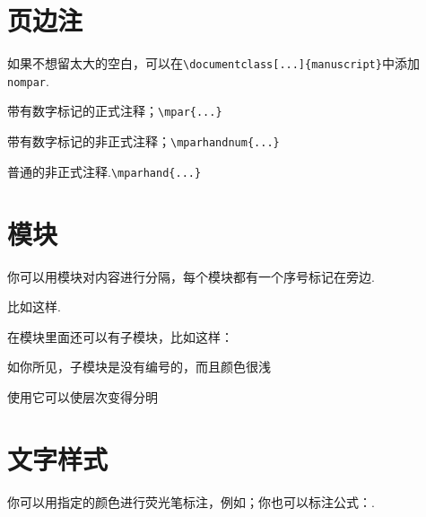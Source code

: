 \documentclass[9pt,oneside,mpar,cn,nclassical]{manuscript}
\begin{document}
    \vspace{-\baselineskip}
    \section{页边注}\subtitle{书写想法的绝妙空白}
    
        如果不想留太大的空白，可以在\verb|\documentclass[...]{manuscript}|中添加\verb|nompar|.
        \begin{itemize*}
            \item 带有数字标记的正式注释；\hfill\verb|\mpar{...}|
            \item 带有数字标记的非正式注释；\hfill\verb|\mparhandnum{...}|
            \item 普通的非正式注释.\hfill\verb|\mparhand{...}|
        \end{itemize*}

    \vspace{-\baselineskip}
    \section{模块}\subtitle{适当地分割模块可以让你的思路更加清晰}

        你可以用模块对内容进行分隔，每个模块都有一个序号标记在旁边. 
        \begin{module}
            比如这样. 

            在模块里面还可以有子模块，比如这样：
            \begin{submodule}
                \begin{itemize*}
                    \item 如你所见，子模块是没有编号的，而且颜色很浅
                    \item 使用它可以使层次变得分明
                \end{itemize*}
            \end{submodule}
        \end{module}

    \vspace{-\baselineskip}
    \section{文字样式}\subtitle{对文字进行一些标注有助于突出重点}

    你可以用指定的颜色进行荧光笔标注，例如；你也可以标注公式：.
\end{document}
